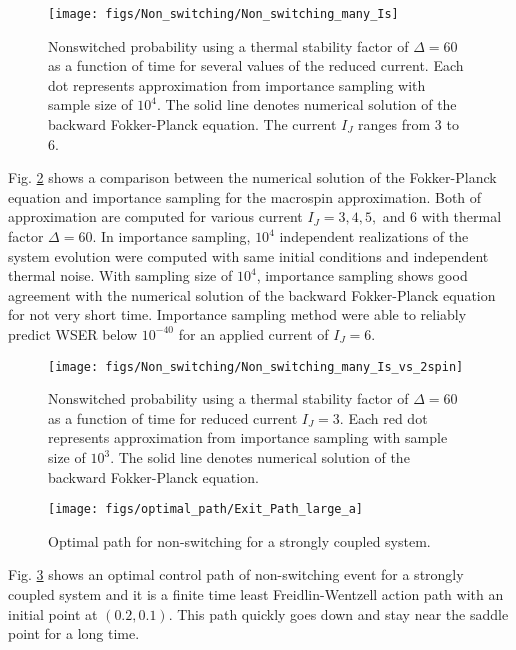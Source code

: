 \documentclass[journal,transmag]{IEEEtran}
\begin{document}
 \begin{figure}[h]
   \centering
         \texttt{[image: figs/Non\_switching/Non\_switching\_many\_Is]}
   \caption{Nonswitched probability using a thermal stability factor of $\Delta = 60$ as a function of time for several values of the reduced current. Each dot represents approximation from importance sampling with sample size of $10^4$. The solid line denotes numerical solution of the backward Fokker-Planck equation. The current $I_J$ ranges from 3 to 6.}
   \label{fig:NS_maroc}
\end{figure}
Fig. \ref{fig:NS_maroc} shows a comparison between the numerical solution
of the Fokker-Planck equation and importance sampling for the macrospin approximation. Both of approximation are computed for various current $I_J = 3, 4, 5,$ and $6$ with thermal factor $\Delta = 60$. In importance sampling, $10^4$ independent realizations of the system evolution were computed with same initial conditions and independent thermal noise. With sampling size of $10^4$, importance sampling shows good agreement with the numerical solution of the backward Fokker-Planck equation for not very short time. Importance sampling method were able to reliably predict WSER below $10^{-40}$ for an applied current of $I_J = 6$.

 \begin{figure}[ht]
   \centering
         \texttt{[image: figs/Non\_switching/Non\_switching\_many\_Is\_vs\_2spin]}
   \caption{Nonswitched probability using a thermal stability factor of $\Delta = 60$ as a function of time for reduced current $I_J = 3$. Each red dot represents approximation from importance sampling with sample size of $10^3$. The solid line denotes numerical solution of the backward Fokker-Planck equation.}
   \label{fig:NS_maroc}
\end{figure}

 \begin{figure}[ht]
   \centering
         \texttt{[image: figs/optimal\_path/Exit\_Path\_large\_a]}
   \caption{Optimal path for non-switching for a strongly coupled system.}
   \label{fig:Non_switching_path}
\end{figure}
Fig. \ref{fig:Non_switching_path} shows an optimal control path of non-switching event for a strongly coupled system and it is a finite time least Freidlin-Wentzell action path with an initial point at $(0.2, 0.1)$. This path quickly goes down and stay near the saddle point for a long time.
\end{document}

